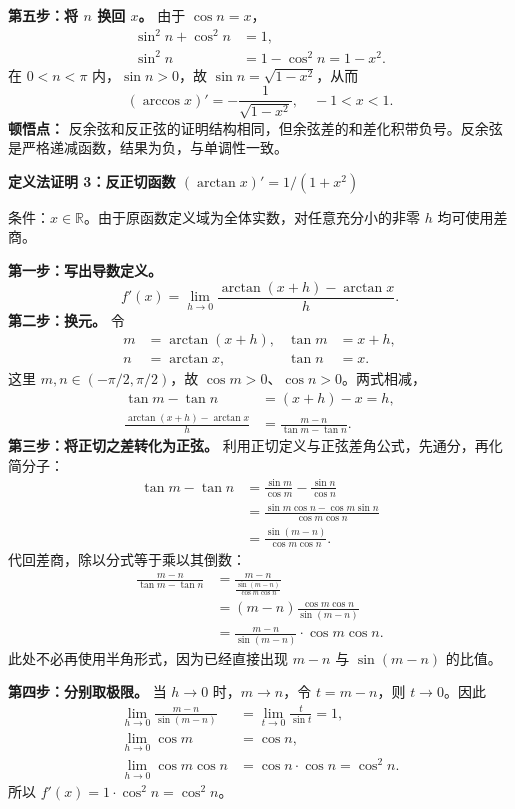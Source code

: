 \begin{proofbox}
\textbf{第五步：将 $n$ 换回 $x$。} 由于 $\cos n=x$，
\[
\begin{aligned}
\sin^2n+\cos^2n&=1,\\
\sin^2n&=1-\cos^2n=1-x^2.
\end{aligned}
\]
在 $0<n<\pi$ 内，$\sin n>0$，故 $\sin n=\sqrt{1-x^2}$，从而
\[
\boxed{(\arccos x)'=-\frac{1}{\sqrt{1-x^2}},\quad -1<x<1}.
\]
\textbf{顿悟点：} 反余弦和反正弦的证明结构相同，但余弦差的和差化积带负号。反余弦是严格递减函数，结果为负，与单调性一致。

\medskip
\textbf{定义法证明 3：反正切函数 $(\arctan x)'=1/(1+x^2)$}

条件：$x\in\mathbb R$。由于原函数定义域为全体实数，对任意充分小的非零 $h$ 均可使用差商。

\textbf{第一步：写出导数定义。}
\[
f'(x)=\lim_{h\to0}\frac{\arctan(x+h)-\arctan x}{h}.
\]
\textbf{第二步：换元。} 令
\[
\begin{aligned}
m&=\arctan(x+h),&\tan m&=x+h,\\
n&=\arctan x,&\tan n&=x.
\end{aligned}
\]
这里 $m,n\in(-\pi/2,\pi/2)$，故 $\cos m>0$、$\cos n>0$。两式相减，
\[
\begin{aligned}
\tan m-\tan n&=(x+h)-x=h,\\
\frac{\arctan(x+h)-\arctan x}{h}
&=\frac{m-n}{\tan m-\tan n}.
\end{aligned}
\]
\textbf{第三步：将正切之差转化为正弦。} 利用正切定义与正弦差角公式，先通分，再化简分子：
\[
\begin{aligned}
\tan m-\tan n
&=\frac{\sin m}{\cos m}-\frac{\sin n}{\cos n}\\
&=\frac{\sin m\cos n-\cos m\sin n}{\cos m\cos n}\\
&=\frac{\sin(m-n)}{\cos m\cos n}.
\end{aligned}
\]
代回差商，除以分式等于乘以其倒数：
\[
\begin{aligned}
\frac{m-n}{\tan m-\tan n}
&=\frac{m-n}{\frac{\sin(m-n)}{\cos m\cos n}}\\[4pt]
&=(m-n)\frac{\cos m\cos n}{\sin(m-n)}\\[4pt]
&=\frac{m-n}{\sin(m-n)}\cdot\cos m\cos n.
\end{aligned}
\]
此处不必再使用半角形式，因为已经直接出现 $m-n$ 与 $\sin(m-n)$ 的比值。

\textbf{第四步：分别取极限。} 当 $h\to0$ 时，$m\to n$，令 $t=m-n$，则 $t\to0$。因此
\[
\begin{aligned}
\lim_{h\to0}\frac{m-n}{\sin(m-n)}
&=\lim_{t\to0}\frac{t}{\sin t}=1,\\
\lim_{h\to0}\cos m&=\cos n,\\
\lim_{h\to0}\cos m\cos n&=\cos n\cdot\cos n=\cos^2n.
\end{aligned}
\]
所以 $f'(x)=1\cdot\cos^2n=\cos^2n$。


\end{proofbox}
